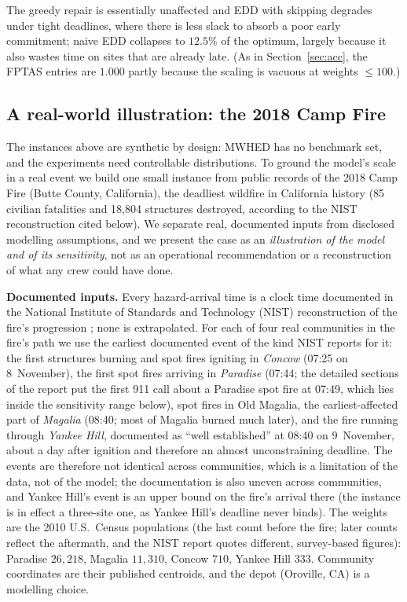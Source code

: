 \documentclass[pdflatex,sn-mathphys-ay]{sn-jnl}
\theoremstyle{thmstyleone}
\theoremstyle{thmstyletwo}
\theoremstyle{thmstylethree}
\begin{document}
The greedy repair is essentially unaffected and EDD with skipping
degrades under tight deadlines, where there is less slack to absorb a
poor early commitment; naive EDD collapses to $12.5\%$ of the optimum,
largely because it also wastes time on sites that are already late.
(As in Section~\ref{sec:acc}, the FPTAS entries are $1.000$ partly
because the scaling is vacuous at weights $\le100$.)

\subsection{A real-world illustration: the 2018 Camp Fire}\label{sec:campfire}

The instances above are synthetic by design: MWHED has no benchmark set,
and the experiments need controllable distributions. To ground the model's
scale in a real event we build one small instance from public records of
the 2018 Camp Fire (Butte County, California), the deadliest wildfire in
California history (85 civilian fatalities and 18{,}804 structures
destroyed, according to the NIST reconstruction cited below). We separate
real, documented inputs from disclosed modelling assumptions, and we
present the case as an \emph{illustration of the model and of its
sensitivity}, not as an operational recommendation or a reconstruction of
what any crew could have done.

\textbf{Documented inputs.} Every hazard-arrival time is a clock time
documented in the National Institute of Standards and Technology (NIST)
reconstruction of the fire's progression \citep{nist2021campfire}; none is
extrapolated. For each of four real communities in the fire's path we use
the earliest documented event of the kind NIST reports for it: the first
structures burning and spot fires igniting in \emph{Concow} (07:25 on
8~November), the first spot fires arriving in \emph{Paradise} (07:44; the
detailed sections of the report put the first 911 call about a Paradise
spot fire at 07:49, which lies inside the sensitivity range below), spot
fires in Old Magalia, the earliest-affected part of \emph{Magalia}
(08:40; most of Magalia burned much later), and the fire running through
\emph{Yankee Hill}, documented as ``well established'' at 08:40 on
9~November, about a day after ignition and therefore an almost
unconstraining deadline. The events are therefore not identical across
communities, which is a limitation of the data, not of the model; the
documentation is also uneven across communities, and Yankee Hill's event
is an upper bound on the fire's arrival there (the instance is in effect
a three-site one, as Yankee Hill's deadline never binds).
The weights are the 2010 U.S.\ Census populations (the last count before
the fire; later counts reflect the aftermath, and the NIST report quotes
different, survey-based figures): Paradise $26{,}218$, Magalia
$11{,}310$, Concow $710$, Yankee Hill $333$. Community coordinates are
their published centroids, and the depot (Oroville, CA) is a modelling
choice.
\end{document}
